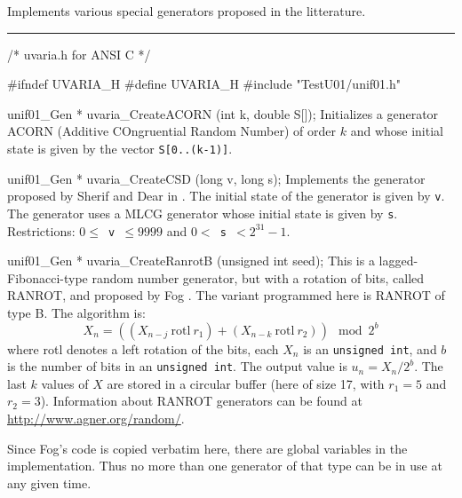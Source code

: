 
Implements various special generators proposed in the litterature.


\bigskip
\hrule
\code
\hide
/* uvaria.h for ANSI C */

#ifndef UVARIA_H
#define UVARIA_H
\endhide
#include "TestU01/unif01.h"


unif01_Gen * uvaria_CreateACORN (int k, double S[]);
\endcode
  \tab  Initializes a generator ACORN (Additive COngruential Random Number)
  \cite{rWIK89a} of order $k$ and
%
   whose initial state is given by the vector {\tt S[0..(k-1)]}.
  \endtab
\code


unif01_Gen * uvaria_CreateCSD (long v, long s);
\endcode
  \tab Implements the generator proposed by Sherif and
%
   Dear in \cite{rSHE90a}.  The initial state of the generator is given
   by {\tt v}.  The generator uses a  MLCG generator whose
   initial state is given by {\tt s}.  Restrictions:
   {\tt $0 \le$ v $\le 9999$} and {\tt $0 <$ s $< 2^{31}-1$}.
  \endtab
\code


unif01_Gen * uvaria_CreateRanrotB (unsigned int seed);
\endcode
  \tab
  This is a lagged-Fibonacci-type random number generator, but
%
  with a rotation of bits, called RANROT, and proposed by
  Fog \cite{rFOG01a}.  The variant programmed here is RANROT of type B.
  The algorithm is:
  $$
    X_n = \left((X_{n-j}\ \mbox{rotl}\  r_1) +
          (X_{n-k}\  \mbox{rotl}\  r_2)\right) \mod 2^b
  $$
  where rotl denotes a left rotation of the bits,
  each $X_n$ is an {\tt unsigned int},
  and $b$ is the number of bits in an {\tt unsigned int}.
  The output value is $u_n = X_n/2^b$.
  The last $k$ values of $X$ are stored in a circular buffer
  (here of size 17, with $r_1 = 5$ and $r_2 = 3$).
  Information about RANROT generators can be found at
  \url{http://www.agner.org/random/}.

  Since Fog's code is copied verbatim here, there are global
  variables in the implementation. Thus no more than
  one generator of that type can be in use at any given time.
 \endtab
\code


